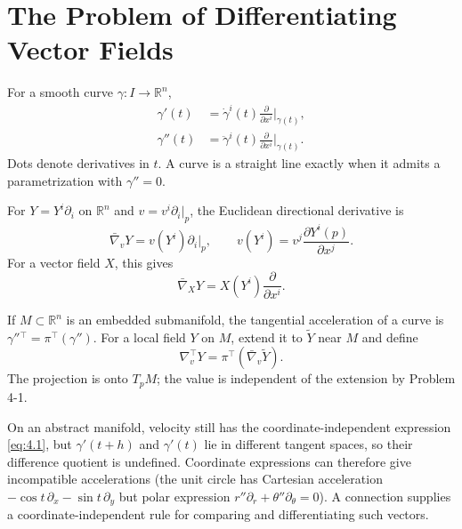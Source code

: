 
\section{The Problem of Differentiating Vector Fields}

For a smooth curve $\gamma:I\to\mathbb R^n$,
\begin{align}
\gamma'(t)&=\dot\gamma^i(t)\frac{\partial}{\partial x^i}\bigg|_{\gamma(t)},\label{eq:4.1}\\
\gamma''(t)&=\ddot\gamma^i(t)\frac{\partial}{\partial x^i}\bigg|_{\gamma(t)}.\label{eq:4.2}
\end{align}
Dots denote derivatives in $t$. A curve is a straight line exactly when it admits a parametrization with $\gamma''=0$.

For $Y=Y^i\partial_i$ on $\mathbb R^n$ and $v=v^i\partial_i|_p$, the Euclidean directional derivative is
\[
\bar\nabla_vY=v(Y^i)\partial_i|_p,
\qquad v(Y^i)=v^j\frac{\partial Y^i(p)}{\partial x^j}.
\]
For a vector field $X$, this gives
\begin{equation}
\bar\nabla_XY=X(Y^i)\frac{\partial}{\partial x^i}.\tag{4.3}
\end{equation}

If $M\subset\mathbb R^n$ is an embedded submanifold, the tangential acceleration of a curve is $\gamma''{}^\top=\pi^\top(\gamma'')$. For a local field $Y$ on $M$, extend it to $\widetilde Y$ near $M$ and define
\begin{equation}
\nabla_v^\top Y=\pi^\top(\bar\nabla_v\widetilde Y).\tag{4.4}
\end{equation}
The projection is onto $T_pM$; the value is independent of the extension by Problem 4-1.

On an abstract manifold, velocity still has the coordinate-independent expression \eqref{eq:4.1}, but $\gamma'(t+h)$ and $\gamma'(t)$ lie in different tangent spaces, so their difference quotient is undefined. Coordinate expressions can therefore give incompatible accelerations (the unit circle has Cartesian acceleration $-\cos t\,\partial_x-\sin t\,\partial_y$ but polar expression $r''\partial_r+\theta''\partial_\theta=0$). A connection supplies a coordinate-independent rule for comparing and differentiating such vectors.

